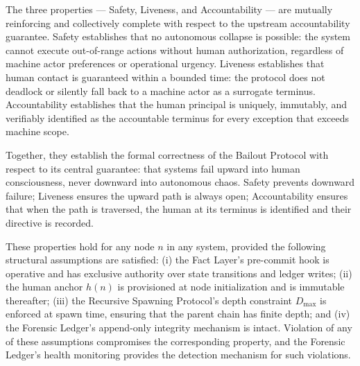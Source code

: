 The three properties — Safety, Liveness, and Accountability — are mutually reinforcing and collectively complete with respect to the upstream accountability guarantee. Safety establishes that no autonomous collapse is possible: the system cannot execute out-of-range actions without human authorization, regardless of machine actor preferences or operational urgency. Liveness establishes that human contact is guaranteed within a bounded time: the protocol does not deadlock or silently fall back to a machine actor as a surrogate terminus. Accountability establishes that the human principal is uniquely, immutably, and verifiably identified as the accountable terminus for every exception that exceeds machine scope.

Together, they establish the formal correctness of the Bailout Protocol with respect to its central guarantee: that \bxthree{} systems fail upward into human consciousness, never downward into autonomous chaos. Safety prevents downward failure; Liveness ensures the upward path is always open; Accountability ensures that when the path is traversed, the human at its terminus is identified and their directive is recorded.

These properties hold for any node $n$ in any \bxthree{} system, provided the following structural assumptions are satisfied: (i) the Fact Layer's pre-commit hook is operative and has exclusive authority over state transitions and ledger writes; (ii) the human anchor $h(n)$ is provisioned at node initialization and is immutable thereafter; (iii) the Recursive Spawning Protocol's depth constraint $D_{\text{max}}$ is enforced at spawn time, ensuring that the parent chain has finite depth; and (iv) the Forensic Ledger's append-only integrity mechanism is intact. Violation of any of these assumptions compromises the corresponding property, and the Forensic Ledger's health monitoring provides the detection mechanism for such violations.

